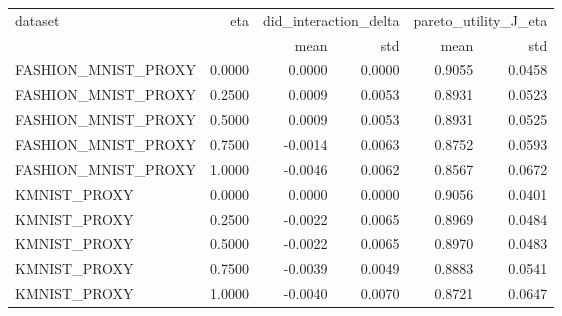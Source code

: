 \begin{tabular}{lrrrrr}
\toprule
dataset & eta & \multicolumn{2}{r}{did\_interaction\_delta} & \multicolumn{2}{r}{pareto\_utility\_J\_eta} \\
 &  & mean & std & mean & std \\
\midrule
FASHION\_MNIST\_PROXY & 0.0000 & 0.0000 & 0.0000 & 0.9055 & 0.0458 \\
FASHION\_MNIST\_PROXY & 0.2500 & 0.0009 & 0.0053 & 0.8931 & 0.0523 \\
FASHION\_MNIST\_PROXY & 0.5000 & 0.0009 & 0.0053 & 0.8931 & 0.0525 \\
FASHION\_MNIST\_PROXY & 0.7500 & -0.0014 & 0.0063 & 0.8752 & 0.0593 \\
FASHION\_MNIST\_PROXY & 1.0000 & -0.0046 & 0.0062 & 0.8567 & 0.0672 \\
KMNIST\_PROXY & 0.0000 & 0.0000 & 0.0000 & 0.9056 & 0.0401 \\
KMNIST\_PROXY & 0.2500 & -0.0022 & 0.0065 & 0.8969 & 0.0484 \\
KMNIST\_PROXY & 0.5000 & -0.0022 & 0.0065 & 0.8970 & 0.0483 \\
KMNIST\_PROXY & 0.7500 & -0.0039 & 0.0049 & 0.8883 & 0.0541 \\
KMNIST\_PROXY & 1.0000 & -0.0040 & 0.0070 & 0.8721 & 0.0647 \\
\bottomrule
\end{tabular}


